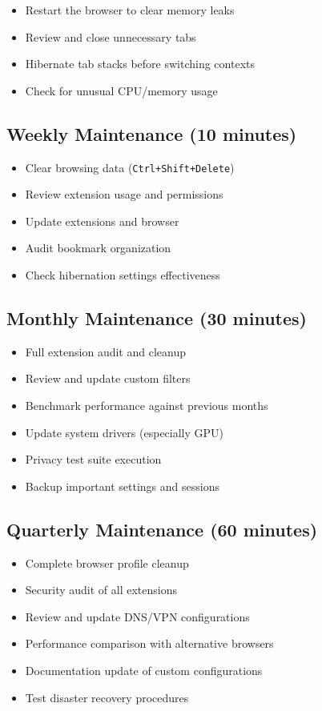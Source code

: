 \documentclass[11pt,a4paper,oneside]{book}
\newcommand{\keystroke}[1]{\texttt{\color{primaryblue}#1}}
\begin{document}
\begin{itemize}
    \item Restart the browser to clear memory leaks
    \item Review and close unnecessary tabs
    \item Hibernate tab stacks before switching contexts
    \item Check for unusual CPU/memory usage
\end{itemize}

\subsection{Weekly Maintenance (10 minutes)}

\begin{itemize}
    \item Clear browsing data (\keystroke{Ctrl+Shift+Delete})
    \item Review extension usage and permissions
    \item Update extensions and browser
    \item Audit bookmark organization
    \item Check hibernation settings effectiveness
\end{itemize}

\subsection{Monthly Maintenance (30 minutes)}

\begin{itemize}
    \item Full extension audit and cleanup
    \item Review and update custom filters
    \item Benchmark performance against previous months
    \item Update system drivers (especially GPU)
    \item Privacy test suite execution
    \item Backup important settings and sessions
\end{itemize}

\subsection{Quarterly Maintenance (60 minutes)}

\begin{itemize}
    \item Complete browser profile cleanup
    \item Security audit of all extensions
    \item Review and update DNS/VPN configurations
    \item Performance comparison with alternative browsers
    \item Documentation update of custom configurations
    \item Test disaster recovery procedures
\end{itemize}
\end{document}
